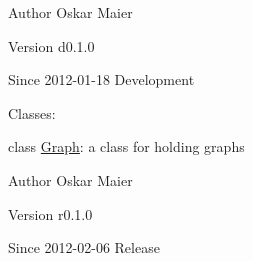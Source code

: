 \begin{DoxyAuthor}{Author}
Oskar Maier 
\end{DoxyAuthor}
\begin{DoxyVersion}{Version}
d0.1.0 
\end{DoxyVersion}
\begin{DoxySince}{Since}
2012-\/01-\/18  Development
\end{DoxySince}
Classes:
\begin{DoxyItemize}
\item class \hyperlink{classmedpy_1_1graphcut_1_1graph_1_1Graph}{Graph}: a class for holding graphs
\end{DoxyItemize}

\begin{DoxyAuthor}{Author}
Oskar Maier 
\end{DoxyAuthor}
\begin{DoxyVersion}{Version}
r0.1.0 
\end{DoxyVersion}
\begin{DoxySince}{Since}
2012-\/02-\/06  Release 
\end{DoxySince}

